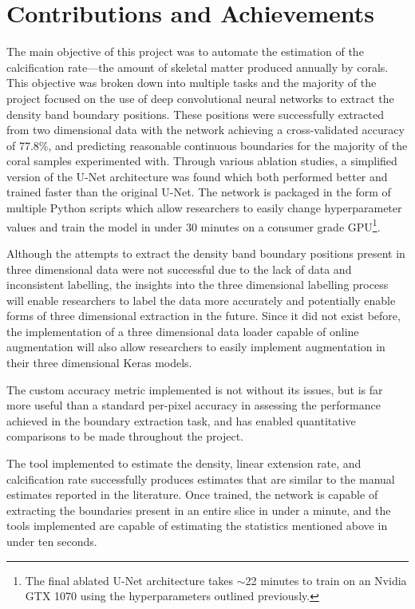 \section{Contributions and Achievements}

The main objective of this project was to automate the estimation of the calcification rate---the amount of skeletal matter produced annually by corals. This objective was broken down into multiple tasks and the majority of the project focused on the use of deep convolutional neural networks to extract the density band boundary positions. These positions were successfully extracted from two dimensional data with the network achieving a cross-validated accuracy of 77.8\%, and predicting reasonable continuous boundaries for the majority of the coral samples experimented with. Through various ablation studies, a simplified version of the U-Net architecture was found which both performed better and trained faster than the original U-Net. The network is packaged in the form of multiple Python scripts which allow researchers to easily change hyperparameter values and train the model in under 30 minutes on a consumer grade GPU\footnote{The final ablated U-Net architecture takes ${\sim}$22 minutes to train on an Nvidia GTX 1070 using the hyperparameters outlined previously.}.

Although the attempts to extract the density band boundary positions present in three dimensional data were not successful due to the lack of data and inconsistent labelling, the insights into the three dimensional labelling process will enable researchers to label the data more accurately and potentially enable forms of three dimensional extraction in the future. Since it did not exist before, the implementation of a three dimensional data loader capable of online augmentation will also allow researchers to easily implement augmentation in their three dimensional Keras models.

The custom accuracy metric implemented is not without its issues, but is far more useful than a standard per-pixel accuracy in assessing the performance achieved in the boundary extraction task, and has enabled quantitative comparisons to be made throughout the project.

The tool implemented to estimate the density, linear extension rate, and calcification rate successfully produces estimates that are similar to the manual estimates reported in the literature. Once trained, the network is capable of extracting the boundaries present in an entire slice in under a minute, and the tools implemented are capable of estimating the statistics mentioned above in under ten seconds.

